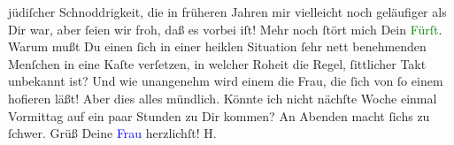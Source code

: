               jüdiſcher Schnoddrigkeit, die in früheren Jahren mir vielleicht noch geläufiger als
               Dir war, aber ſeien wir froh, daß es vorbei iſt! Mehr noch ſtört mich Dein \textcolor{green}{Fürſt}{}. Warum mußt Du einen ſich in
               einer heiklen Situation ſehr nett benehmenden Menſchen in eine Kaſte verſetzen, in
               welcher Roheit die Regel, ſittlicher Takt unbekannt ist? Und wie unangenehm wird
               einem die Frau, die ſich von ſo einem hofieren läßt! Aber dies alles mündlich. Könnte
               ich nicht nächſte Woche einmal Vormittag auf ein paar Stunden zu Dir kommen? An
               Abenden macht ſichs zu ſchwer. Grüß Deine \textcolor{blue}{Frau}{} herzlichſt! \spacefill\mbox{H.}\pend
           \endnumbering{}  
      
